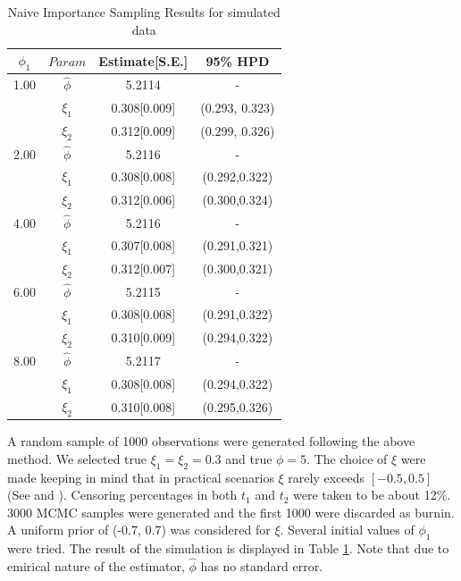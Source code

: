 \documentclass[11pt]{article}
\theoremstyle{remboldstyle}
\begin{document}
\begin{table}[H]
\caption{Naive Importance Sampling Results for simulated data}
\centering
\begin{tabular}{c c c c}
\hline
$\phi_{1}$ & $Param$      & Estimate[S.E.] & 95\% HPD\\
\hline
1.00          & $\hat{\phi}$ & 5.2114              & -\\
              & $\xi_1$      & 0.308[0.009]        & (0.293, 0.323)\\   
              & $\xi_2$      & 0.312[0.009]        & (0.299, 0.326)\\
              \hline 
2.00          & $\hat{\phi}$ & 5.2116              & -\\
              & $\xi_1$      & 0.308[0.008]        & (0.292,0.322)\\   
              & $\xi_2$      & 0.312[0.006]        & (0.300,0.324)\\
              \hline
4.00          & $\hat{\phi}$ & 5.2116              & -\\
              & $\xi_1$      & 0.307[0.008]        & (0.291,0.321)\\   
              & $\xi_2$      & 0.312[0.007]        & (0.300,0.321)\\
              \hline
6.00          & $\hat{\phi}$ & 5.2115              & -\\
              & $\xi_1$      & 0.308[0.008]        & (0.291,0.322)\\   
              & $\xi_2$      & 0.310[0.009]        & (0.294,0.322)\\
              \hline
8.00         & $\hat{\phi}$ & 5.2117              & -\\
              & $\xi_1$      & 0.308[0.008]        & (0.294,0.322)\\   
              & $\xi_2$      & 0.310[0.008]        & (0.295,0.326)\\
              \hline             
\end{tabular}
\label{tab1}
\end{table}
\noindent
A random sample of 1000 observations were generated following the above method. We selected true $\xi_1 = \xi_2 = 0.3$ and true $\phi = 5$. The choice of $\xi$ were made keeping in mind that in practical scenarios $\xi$ rarely exceeds $[-0.5, 0.5]$ (See \cite{castillo:1997} and \cite{smith:1985}).  Censoring percentages in both $t_1$ and $t_2$ were taken to be about 12\%. 3000 MCMC samples were generated and the first 1000 were discarded as burnin. A uniform prior of (-0.7, 0.7) was considered for $\xi$.  Several initial values of $\phi_1$ were tried. The result of the simulation is displayed in Table \ref{tab1}. Note that due to emirical nature of the estimator, $\hat{\phi}$ has no standard error.
\end{document}
